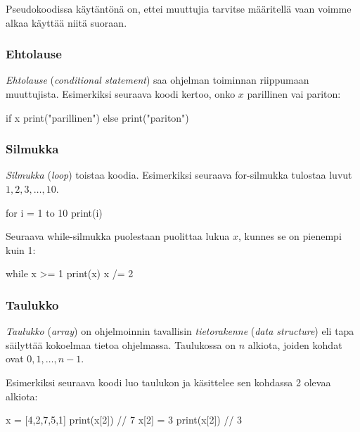 Pseudokoodissa käytäntönä on,
ettei muuttujia tarvitse määritellä vaan
voimme alkaa käyttää niitä suoraan.

\subsubsection{Ehtolause}


\emph{Ehtolause} (\emph{conditional statement}) saa ohjelman toiminnan
riippumaan muuttujista.
Esimerkiksi seuraava koodi kertoo, onko $x$ parillinen vai pariton:

\begin{code}
if x%
    print("parillinen")
else
    print("pariton")
\end{code}

\subsubsection{Silmukka}


\emph{Silmukka} (\emph{loop}) toistaa koodia.
Esimerkiksi seuraava for-silmukka tulostaa luvut $1,2,3,\dots,10$.

\begin{code}
for i = 1 to 10
    print(i)
\end{code}

Seuraava while-silmukka puolestaan puolittaa lukua $x$,
kunnes se on pienempi kuin 1:

\begin{code}
while x >= 1
    print(x)
    x /= 2
\end{code}

\subsubsection{Taulukko}


\emph{Taulukko} (\emph{array}) on ohjelmoinnin tavallisin \emph{tietorakenne}
(\emph{data structure})
eli tapa säilyttää kokoelmaa tietoa ohjelmassa.
Taulukossa on $n$ alkiota, joiden kohdat ovat $0,1,\dots,n-1$.

Esimerkiksi seuraava koodi luo taulukon ja käsittelee
sen kohdassa 2 olevaa alkiota:

\begin{code}
x = [4,2,7,5,1]
print(x[2]) // 7
x[2] = 3
print(x[2]) // 3
\end{code}

